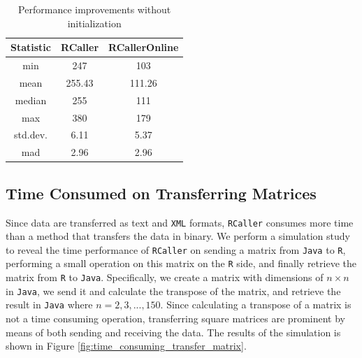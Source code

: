 \documentclass[10pt,a4paper, final, oneside]{article}
\begin{document}
\begin{table}[H]
\begin{center}
\caption{Performance improvements without initialization}
\label{tbl:performance_improvements_without_init}
\begin{tabular}{|c|cc|}

\hline
Statistic & RCaller & RCallerOnline \\
\hline
min       &   247     &  103           \\
mean      &   255.43  &  111.26         \\
median    &   255     &  111             \\
max       &   380     &  179            \\
\hline
std.dev.  &   6.11   &  5.37            \\
mad       &   2.96   &  2.96             \\
\hline
\end{tabular}
\end{center}
\end{table}




\subsection{Time Consumed on Transferring Matrices}
\label{sec:time_consumed_transfer_matrix}
Since data are transferred as text and \texttt{XML} formats, \texttt{RCaller} consumes more time than a method that transfers the data in binary. We perform a simulation study to reveal the time performance of \texttt{RCaller} on sending a matrix from \texttt{Java} to \texttt{R}, performing a small operation on this matrix on the \texttt{R} side, and finally retrieve the matrix from \texttt{R} to \texttt{Java}. Specifically, we create a matrix with dimensions of $n \times n$ in \texttt{Java}, we send it and calculate the transpose of the matrix, and retrieve the result in \texttt{Java} where $n = 2, 3, ..., 150$. Since calculating a transpose of a matrix is not a time consuming operation, transferring square matrices are prominent by means of both sending and receiving the data. The results of the simulation is shown in Figure \ref{fig:time_consuming_transfer_matrix}. 
\end{document}
